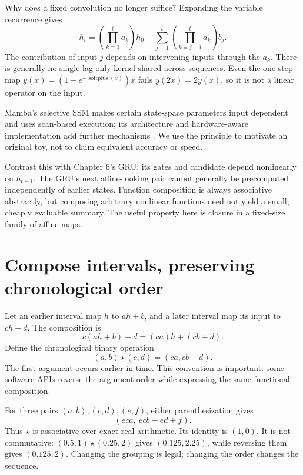 Why does a fixed convolution no longer suffice? Expanding the variable
recurrence gives
\begin{equation}
 h_t=\left(\prod_{k=1}^t a_k\right)h_0+
      \sum_{j=1}^t\left(\prod_{k=j+1}^t a_k\right)b_j.
 \label{eq:variable}
\end{equation}
The contribution of input $j$ depends on intervening inputs through the
$a_k$. There is generally no single lag-only kernel shared across
sequences. Even the one-step map
$y(x)=(1-e^{-\operatorname{softplus}(x)})x$ fails
$y(2x)=2y(x)$, so it is not a linear operator on the input.

Mamba's selective SSM makes certain state-space parameters input dependent
and uses scan-based execution; its architecture and hardware-aware
implementation add further mechanisms \cite{mamba}. We use the principle
to motivate an original toy, not to claim equivalent accuracy or speed.

Contrast this with Chapter 6's GRU: its gates and candidate depend
nonlinearly on $h_{t-1}$. The GRU's next affine-looking pair cannot
generally be precomputed independently of earlier states. Function
composition is always associative abstractly, but composing arbitrary
nonlinear functions need not yield a small, cheaply evaluable summary.
The useful property here is closure in a fixed-size family of affine maps.

\section{Compose intervals, preserving chronological order}

Let an earlier interval map $h$ to $ah+b$, and a later interval map
its input to $ch+d$. The composition is
\begin{equation}
 c(ah+b)+d=(ca)h+(cb+d).
\end{equation}
Define the chronological binary operation
\begin{equation}
 (a,b)\star(c,d)=(ca,cb+d).
 \label{eq:compose}
\end{equation}
The first argument occurs earlier in time. This convention is important:
some software APIs reverse the argument order while expressing the
same functional composition.


For three pairs $(a,b),(c,d),(e,f)$, either parenthesization gives
\begin{equation}
 (eca,\ ecb+ed+f).
\end{equation}
Thus $\star$ is associative over exact real arithmetic. Its identity
is $(1,0)$. It is not commutative: $(0.5,1)\star(0.25,2)$ gives
$(0.125,2.25)$, while reversing them gives $(0.125,2)$.
Changing the grouping is legal; changing the order changes the sequence.

